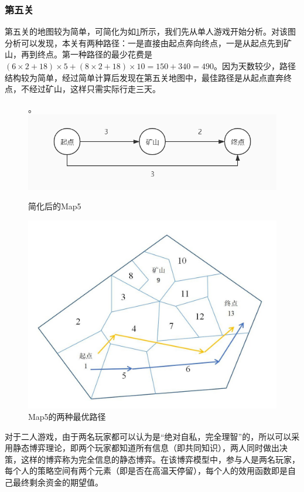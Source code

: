 \documentclass[withoutpreface,bwprint]{cumcmthesis} %
\begin{document}
\subsubsection{第五关}
第五关的地图较为简单，可简化为如\cref{fig:map5}所示，我们先从单人游戏开始分析。对该图分析可以发现，本关有两种路径：一是直接由起点奔向终点，一是从起点先到矿山，再到终点。第一种路径的最少花费是$(6\times2+18)\times5+(8\times2+18)\times10=150+340=490$。因为天数较少，路径结构较为简单，经过简单计算后发现在第五关地图中，最佳路径是从起点直奔终点，不经过矿山，这样只需实际行走三天。
\begin{figure}[H]
	\centering。
	\includegraphics[scale=0.5]{figures/map3.jpg}
	\caption{简化后的Map5}
	\label{fig:map5}
\end{figure}
\begin{figure}[H]
	\centering
	\includegraphics[scale=0.5]{figures/map5path}
	\caption{Map5的两种最优路径}	
\end{figure}
对于二人游戏，由于两名玩家都可以认为是“绝对自私，完全理智”的，所以可以采用静态博弈理论，即两个玩家都知道所有信息（即共同知识），两人同时做出决策，这样的博弈称为完全信息的静态博弈。在该博弈模型中，参与人是两名玩家，每个人的策略空间有两个元素（即是否在高温天停留），每个人的效用函数即是自己最终剩余资金的期望值。
\end{document}
